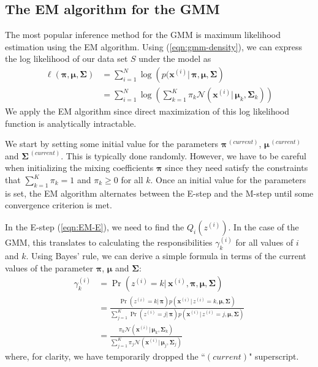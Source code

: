 \documentclass[final,3p,times,twocolumn]{elsarticle}
\let\bs\boldsymbol
\begin{document}
\subsection{The EM algorithm for the GMM}
The most popular inference method for the GMM is maximum likelihood estimation using the EM algorithm.
Using (\ref{eqn:gmm-density}), we can express the log likelihood of our data set $S$ under the model as
\begin{equation*}
\begin{split}
\ell(\bs\pi,\bs\mu,\bs\Sigma) &= \sum_{i=1}^N \log \left(p(\bs x^{(i)}|\,\bs\pi,\bs\mu,\bs\Sigma\right)\\
&= \sum_{i=1}^N \log \left(\sum_{k=1}^K \pi_k \mathcal{N}(\bs x^{(i)}|\,\bs\mu_k,\bs\Sigma_k)\right)
\end{split}
\end{equation*}
We apply the EM algorithm since direct maximization of this log likelihood function is analytically intractable. 

We start by setting some initial value for the parameters $\bs\pi^{\,(current)}$, $\bs\mu^{\,(current)}$ and $\bs\Sigma^{\,(current)}$.
This is typically done randomly.
However, we have to be careful when initializing the mixing coefficients $\bs\pi$ since they need satisfy the constraints that $\sum_{k=1}^K \pi_k = 1$ and $\pi_k \geq 0$ for all $k$.
Once an initial value for the parameters is set, the EM algorithm alternates between the E-step and the M-step until some convergence criterion is met.

In the E-step (\ref{eqn:EM-E}), we need to find the $Q_i(z^{(i)})$.
In the case of the GMM, this translates to calculating the responsibilities $\gamma_k^{(i)}$ for all values of $i$ and $k$.
Using Bayes' rule, we can derive a simple formula in terms of the current values of the parameter $\bs\pi$, $\bs\mu$ and $\bs\Sigma$:
\begin{equation}
\label{eqn:gmmresponsibility}
\begin{split}
\gamma_k^{(i)} &= \Pr(z^{(i)}=k|\,\bs x^{(i)},\bs\pi,\bs\mu,\bs\Sigma)\\
&= \frac{\Pr(z^{(i)}=k|\,\bs\pi)p(\bs x^{(i)}|\,z^{(i)}=k,\bs\mu,\bs\Sigma)}{\sum_{j=1}^K \Pr(z^{(i)}=j|\,\bs\pi)p(\bs x^{(i)}|\,z^{(i)}=j,\bs\mu,\bs\Sigma)}\\
&= \frac{\pi_k\mathcal{N}(\bs x^{(i)}|\,\bs\mu_k,\bs\Sigma_k)}{\sum_{j=1}^K \pi_j\mathcal{N}(\bs x^{(i)}|\,\bs\mu_j,\bs\Sigma_j)}
\end{split}
\end{equation}
where, for clarity, we have temporarily dropped the ``$(current)$" superscript.
\end{document}
